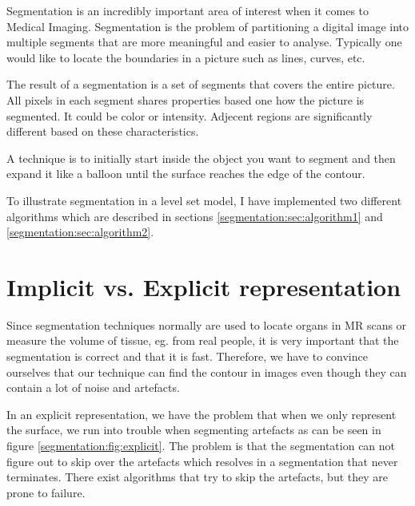 
Segmentation is an incredibly important area of interest when it comes
to Medical Imaging. Segmentation is the problem of partitioning a
digital image into multiple segments that are more meaningful and
easier to analyse. Typically one would like to locate the boundaries
in a picture such as lines, curves, etc.

The result of a segmentation is a set of segments that covers the
entire picture. All pixels in each segment shares properties based one
how the picture is segmented. It could be color or intensity. Adjecent
regions are significantly different based on these characteristics.

A technique is to initially start inside the object you want to
segment and then expand it like a balloon until the surface reaches
the edge of the contour.

To illustrate segmentation in a level set model, I have implemented
two different algorithms which are described in sections
\vref{segmentation:sec:algorithm1} and
\vref{segmentation:sec:algorithm2}.

\section{Implicit vs. Explicit representation}

Since segmentation techniques normally are used to locate organs in MR
scans or measure the volume of tissue, eg. from real people, it is
very important that the segmentation is correct and that it is
fast. Therefore, we have to convince ourselves that our technique can
find the contour in images even though they can contain a lot of noise
and artefacts.

In an explicit representation, we have the problem that when we only
represent the surface, we run into trouble when segmenting artefacts
as can be seen in figure \vref{segmentation:fig:explicit}. The problem
is that the segmentation can not figure out to skip over the artefacts
which resolves in a segmentation that never terminates. There exist
algorithms that try to skip the artefacts, but they are prone to
failure.


